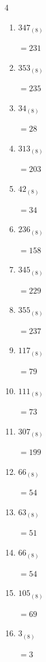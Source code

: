 \begin{multicols}{4}
\begin{enumerate}
        $=41$

  \item $347_{(8)}$

        $=231$

  \item $353_{(8)}$

        $=235$

  \item $34_{(8)}$

        $=28$

  \item $313_{(8)}$

        $=203$

  \item $42_{(8)}$

        $=34$

  \item $236_{(8)}$

        $=158$

  \item $345_{(8)}$

        $=229$

  \item $355_{(8)}$

        $=237$

  \item $117_{(8)}$

        $=79$

  \item $111_{(8)}$

        $=73$

\columnbreak %

  \item $307_{(8)}$

        $=199$

  \item $66_{(8)}$

        $=54$

  \item $63_{(8)}$

        $=51$

  \item $66_{(8)}$

        $=54$

  \item $105_{(8)}$

        $=69$

  \item $3_{(8)}$

        $=3$


\end{enumerate}
\end{multicols}
